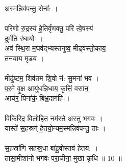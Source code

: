 अ॒स्मन्निव॑पन्तु॒ सेना᳚: ।\\
\\
परि॑णो रु॒द्रस्य॑ हे॒तिर्वृ॑णक्तु॒ परि॑ त्वे॒षस्य॑\\
दुर्म॒ति र॑घा॒योः ।\\
अव॑ स्थि॒रा म॒घव॑द्भ्यस्तनुष्व॒ मीढ्व॑स्तो॒काय॒\\
तन॑याय मृडय ।\\
\\
मीढु॑ष्टम॒ शिव॑तम शि॒वो न॑: सु॒मना॑ भव ।\\
प॒र॒मे वृ॒क्ष आयु॑धन्नि॒धाय॒ कृत्तिं॒ वसा॑न॒\\
आच॑र॒ पिना॑कं॒ बिभ्र॒दाग॑हि ।\\
\\
विकि॑रिद॒ विलो॑हित॒ नम॑स्ते अस्तु भगवः ।\\
यास्ते॑ स॒हस्रग्ं॑ हे॒तयो॒न्यम॒स्मन्निव॑पन्तु॒ ताः ।\\
\\
स॒हस्रा॑णि सहस्र॒धा बा॑हु॒वोस्तव॑ हे॒तय॑: ।\\
तासा॒मीशा॑नो भगवः परा॒चीना॒ मुखा॑ कृधि ॥ 10 ॥\\
